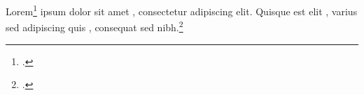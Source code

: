\documentclass[a4paper]{article}
\begin{document}
Lorem\footcite{bible} ipsum dolor sit amet , consectetur
adipiscing elit. Quisque est elit , varius sed adipiscing
quis , consequat sed nibh.\footcite{bible}
\printbibliography[title=Zitierte Werke]
\end{document}
